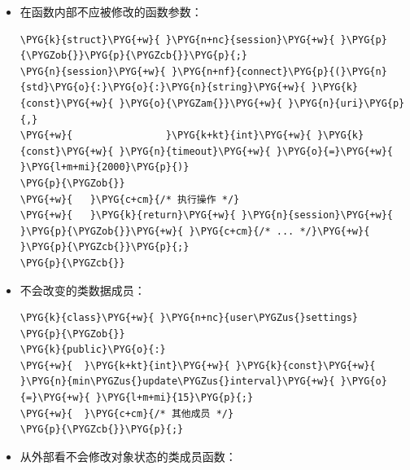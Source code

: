 \begin{itemize}
\item 在函数内部不应被修改的函数参数：


\begin{codeblockbg}
\begin{Verbatim}[commandchars=\\\{\},breaklines=true,breakanywhere=true,fontsize=\codefont,xleftmargin=17bp]
\PYG{k}{struct}\PYG{+w}{ }\PYG{n+nc}{session}\PYG{+w}{ }\PYG{p}{\PYGZob{}}\PYG{p}{\PYGZcb{}}\PYG{p}{;}
\PYG{n}{session}\PYG{+w}{ }\PYG{n+nf}{connect}\PYG{p}{(}\PYG{n}{std}\PYG{o}{:}\PYG{o}{:}\PYG{n}{string}\PYG{+w}{ }\PYG{k}{const}\PYG{+w}{ }\PYG{o}{\PYGZam{}}\PYG{+w}{ }\PYG{n}{uri}\PYG{p}{,}
\PYG{+w}{                }\PYG{k+kt}{int}\PYG{+w}{ }\PYG{k}{const}\PYG{+w}{ }\PYG{n}{timeout}\PYG{+w}{ }\PYG{o}{=}\PYG{+w}{ }\PYG{l+m+mi}{2000}\PYG{p}{)}
\PYG{p}{\PYGZob{}}
\PYG{+w}{   }\PYG{c+cm}{/* 执行操作 */}
\PYG{+w}{   }\PYG{k}{return}\PYG{+w}{ }\PYG{n}{session}\PYG{+w}{ }\PYG{p}{\PYGZob{}}\PYG{+w}{ }\PYG{c+cm}{/* ... */}\PYG{+w}{ }\PYG{p}{\PYGZcb{}}\PYG{p}{;}
\PYG{p}{\PYGZcb{}}
\end{Verbatim}
\end{codeblockbg}



\item 不会改变的类数据成员：



\begin{codeblockbg}
\begin{Verbatim}[commandchars=\\\{\},breaklines=true,breakanywhere=true,fontsize=\codefont,xleftmargin=17bp]
\PYG{k}{class}\PYG{+w}{ }\PYG{n+nc}{user\PYGZus{}settings}
\PYG{p}{\PYGZob{}}
\PYG{k}{public}\PYG{o}{:}
\PYG{+w}{  }\PYG{k+kt}{int}\PYG{+w}{ }\PYG{k}{const}\PYG{+w}{ }\PYG{n}{min\PYGZus{}update\PYGZus{}interval}\PYG{+w}{ }\PYG{o}{=}\PYG{+w}{ }\PYG{l+m+mi}{15}\PYG{p}{;}
\PYG{+w}{  }\PYG{c+cm}{/* 其他成员 */}
\PYG{p}{\PYGZcb{}}\PYG{p}{;}
\end{Verbatim}
\end{codeblockbg}



\item 从外部看不会修改对象状态的类成员函数：




\end{itemize}
